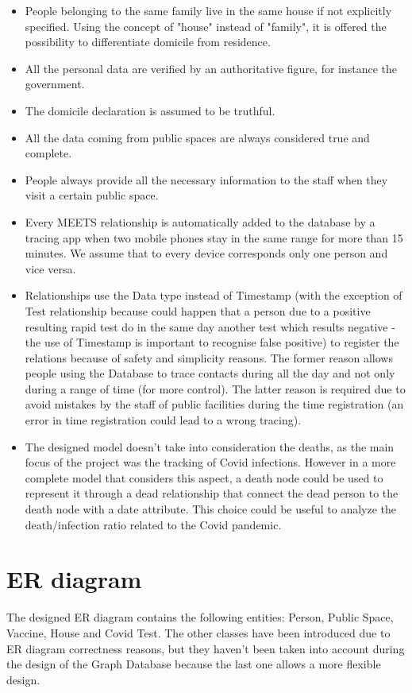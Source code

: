 \documentclass{article}
\begin{document}
\begin{itemize}

\item People belonging to the same family live in the same house if not explicitly specified. Using the concept of "house" instead of "family", it is offered the possibility to differentiate domicile from residence.
\item All the personal data are verified by an authoritative figure, for instance the government.
\item The domicile declaration is assumed to be truthful.
\item All the data coming from public spaces are always considered true and complete.
\item People always provide all the necessary information to the staff when they visit a certain public space.
\item Every MEETS relationship is automatically added to the database by a tracing app when two mobile phones stay in the same range for more than 15 minutes. We assume that to every device corresponds only one person and vice versa.
\item Relationships use the Data type instead of Timestamp (with the exception of Test relationship because could happen that a person due to a positive resulting rapid test do in the same day another test which results negative - the use of Timestamp is important to recognise false positive) to register the relations because of safety and simplicity reasons. The former reason allows people using the Database to trace contacts during all the day and not only during a range of time (for more control). The latter reason is required due to avoid mistakes by the staff of public facilities during the time registration (an error in time registration could lead to a wrong tracing).
\item The designed model doesn't take into consideration the deaths, as the main focus of the project was the tracking of Covid infections. However in a more complete model that considers this aspect, a death node could be used to represent it through a dead relationship that connect the dead person to the death node with a date attribute. This choice could be useful to analyze the death/infection ratio related to the Covid pandemic.

\end{itemize}

\section{ER diagram}
The designed ER diagram contains the following entities: Person, Public Space, Vaccine, House and Covid Test. The other classes have been introduced due to ER diagram correctness reasons, but they haven't been taken into account during the design of the Graph Database because the last one allows a more flexible design.
\end{document}
